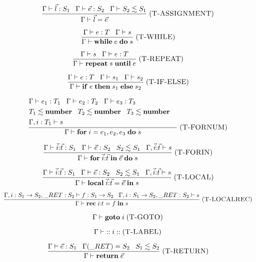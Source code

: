\documentclass[12pt]{article}
\newcommand{\Number}{\mathbf{number}}
\newcommand{\kw}[1]{\mathbf{#1}}
\newcommand{\mylabel}[1]{\; (\textsc{#1})}
\newcommand{\env}{\Gamma}
\newcommand{\ret}{\string_RET}
\begin{document}
\[
\frac{\env \vdash \vec{l}:S_{1} \;\;\;
      \env \vdash \vec{e}:S_{2} \;\;\;
      \env \vdash S_{2} \lesssim S_{1}}
     {\env \vdash \vec{l} = \vec{e}}
\mylabel{T-ASSIGNMENT}
\]

\[
\frac{\env \vdash e:T \;\;\;
      \env \vdash s}
     {\env \vdash \kw{while} \; e \; \kw{do} \; s}
\mylabel{T-WHILE}
\]

\[
\frac{\env \vdash s \;\;\;
      \env \vdash e:T}
     {\env \vdash \kw{repeat} \; s \; \kw{until} \; e}
\mylabel{T-REPEAT}
\]

\[
\frac{\env \vdash e:T \;\;\;
      \env \vdash s_{1} \;\;\;
      \env \vdash s_{2}}
     {\env \vdash \kw{if} \; e \; \kw{then} \; s_{1} \; \kw{else} \; s_{2}}
\mylabel{T-IF-ELSE}
\]

\[
\frac{\begin{aligned}
      & \env \vdash e_{1}:T_{1} \;\;\;
        \env \vdash e_{2}:T_{2} \;\;\;
        \env \vdash e_{3}:T_{3} & \\
      & T_{1} \lesssim \Number \;\;\;
        T_{2} \lesssim \Number \;\;\;
        T_{3} \lesssim \Number & \\
      & \env, i:T_{1} \vdash s &
      \end{aligned}}
     {\env \vdash \kw{for} \; i = e_{1},e_{2},e_{3} \; \kw{do} \; s}
\mylabel{T-FORNUM}
\]

\[
\frac{\env \vdash \vec{i}{:}\vec{t}:S_{1} \;\;\;
      \env \vdash \vec{e}:S_{2} \;\;\;
      S_{2} \lesssim S_{1} \;\;\;
      \env, \vec{i}{:}\vec{t} \vdash s}
     {\env \vdash \kw{for} \; \vec{i}{:}\vec{t} \; \kw{in} \; \vec{e} \; \kw{do} \; s}
\mylabel{T-FORIN}
\]

\[
\frac{\env \vdash \vec{i}{:}\vec{t}:S_{1} \;\;\;
      \env \vdash \vec{e}:S_{2} \;\;\;
      S_{2} \lesssim S_{1} \;\;\;
      \env, \vec{i}{:}\vec{t} \vdash s}
     {\env \vdash \kw{local} \; \vec{i}{:}\vec{t} = \vec{e} \; \kw{in} \; s}
\mylabel{T-LOCAL}
\]

\[
\frac{\env, i:S_{1} \rightarrow S_{2}, \ret:S_{2} \vdash f:S_{1} \rightarrow S_{2} \;\;\;
      \env, i:S_{1} \rightarrow S_{2}, \ret:S_{2} \vdash s}
     {\env \vdash \kw{rec} \; i{:}t = f \; \kw{in} \; s}
\mylabel{T-LOCALREC}
\]

\[
\env \vdash \kw{goto} \; i
\mylabel{T-GOTO}
\]

\[
\env \vdash {::} \; i \; {::}
\mylabel{T-LABEL}
\]

\[
\frac{\env \vdash \vec{e}:S_{1} \;\;\;
      \env(\ret) = S_{2} \;\;\;
      S_{1} \lesssim S_{2}}
     {\env \vdash \kw{return} \; \vec{e}}
\mylabel{T-RETURN}
\]
\end{document}
